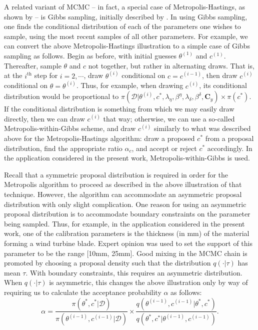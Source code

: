 \documentclass{article}
\begin{document}
A related variant of MCMC -- in fact, a special case of Metropolis-Hastings, as shown by \cite{Gelman1992} -- is Gibbs sampling, initially described by \cite{Geman1984}. In using Gibbs sampling, one finds the conditional distribution of each of the parameters one wishes to sample, using the most recent samples of all other parameters. For example, we can convert the above Metropolis-Hastings illustration to a simple case of Gibbs sampling as follows.
Begin as before, with initial guesses $\theta^{(1)}$ and $c^{(1)}$. Thereafter, sample $\theta$ and $c$ not together, but rather in alternating draws. That is, at the $i^{\text{th} }$ step for $i=2,\cdots$, draw $\theta^{(i)}$ conditional on $c=c^{(i-1)}$, then draw $c^{(i)}$ conditional on $\theta=\theta^{(i)}$. Thus, for example, when drawing $c^{(i)}$, its conditional distribution would be proportional to $\pi(\mathcal D | \theta^{(i)},c^{*},\lambda_\eta, \beta^\eta,\lambda_\delta,\beta^\delta,\mathbf C_y) \times \pi(c^{*})$. 
If the conditional distribution is something from which we may easily draw directly, then we can draw $c^{(i)}$ that way; otherwise, we can use a so-called Metropolis-within-Gibbs scheme, and draw $c^{(i)}$ similarly to what was described above for the Metropolis-Hastings algorithm: draw a proposed $c^*$ from a proposal distribution, find the appropriate ratio $\alpha_c$, and accept or reject $c^*$ accordingly. In the application considered in the present work, Metropolis-within-Gibbs is used.


Recall that a symmetric proposal distribution is required in order for the Metropolis algorithm to proceed as described in the above illustration of that technique. However, the algorithm can accommodate an asymmetric proposal distribution with only slight complication. One reason for using an asymmetric proposal distribution is to accommodate boundary constraints on the parameter being sampled. Thus, for example, in the application considered in the present work, one of the calibration parameters is the thickness (in mm) of the material forming a wind turbine blade. Expert opinion was used to set the support of this parameter to be the range [10mm, 25mm]. Good mixing in the MCMC chain is promoted by choosing a proposal density such that the distribution $q(\cdot|\tau)$ has mean $\tau$. With boundary constraints, this requires an asymmetric distribution. When $q(\cdot|\tau)$ is asymmetric, this changes the above illustration only by way of requiring us to calculate the acceptance probability $\alpha$ as follows:
\begin{equation}\label{eq:mh_correction}
\alpha = \frac{\pi(\theta^*,c^* | \mathcal D)}
{ \pi(\theta^{(i-1)},c^{(i-1)}|\mathcal D) } \times 
\frac{
q(\theta^{(i-1)},c^{(i-1)}|\theta^*,c^*)
}{
q(\theta^*,c^*|\theta^{(i-1)},c^{(i-1)})
}.
\end{equation}
\end{document}
